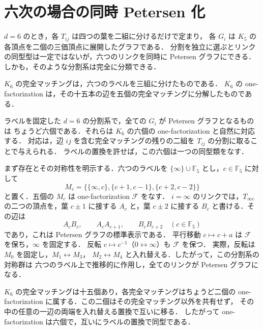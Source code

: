 \section{六次の場合の同時 Petersen 化}\label{topo:petersen-section}

$d=6$ のとき，各 $T_{ij}$ は四つの葉を二組に分けるだけで定まり，
各 $G_i$ は $K_5$ の各頂点を二個の三価頂点に展開したグラフである．
分割を独立に選ぶとリンクの同型型は一定ではないが，六つのリンクを同時に
Petersen グラフにできる．しかも，そのような分割系は完全に分類できる．

\begin{definition}
$K_6$ の完全マッチングは，六つのラベルを三組に分けたものである．
$K_6$ の one-factorization は，その十五本の辺を五個の完全マッチングに分解したものである．
\end{definition}

\begin{theorem}\label{topo:petersen}
ラベルを固定した $d=6$ の分割系で，全ての $G_i$ が Petersen グラフとなるものは
ちょうど六個である．それらは $K_6$ の六個の one-factorization と自然に対応する．
対応は，辺 $ij$ を含む完全マッチングの残りの二組を $T_{ij}$ の分割に取ることで与えられる．
ラベルの置換を許せば，この六個は一つの同型類をなす．
\end{theorem}

まず存在とその対称性を明示する．六つのラベルを
$\{\infty\}\cup\mathbb F_5$ とし，$c\in\mathbb F_5$ に対して
\[
 M_c=\bigl\{\{\infty,c\},\{c+1,c-1\},\{c+2,c-2\}\bigr\}
\]
と置く．五個の $M_c$ は one-factorization $\mathcal F$ をなす．
$i=\infty$ のリンクでは，$T_{\infty c}$ の二つの頂点を，葉 $c\pm1$ に接する
$A_c$ と，葉 $c\pm2$ に接する $B_c$ と書ける．その辺は
\[
 A_cB_c,\qquad A_cA_{c+1},\qquad B_cB_{c+2}\quad(c\in\mathbb F_5)
\]
であり，これは Petersen グラフの標準表示である．
平行移動 $c\mapsto c+a$ は $\mathcal F$ を保ち，$\infty$ を固定する．
反転 $c\mapsto c^{-1}$（$0\leftrightarrow\infty$）も $\mathcal F$ を保つ．
実際，反転は $M_0$ を固定し，$M_1\leftrightarrow M_3$，
$M_2\leftrightarrow M_4$ と入れ替える．したがって，この分割系の対称群は
六つのラベル上で推移的に作用し，全てのリンクが Petersen グラフになる．

\begin{lemma}\label{topo:factorizations}
$K_6$ の完全マッチングは十五個あり，各完全マッチングはちょうど二個の
one-factorization に属する．この二個はその完全マッチング以外を共有せず，
その中の任意の一辺の両端を入れ替える置換で互いに移る．
したがって one-factorization は六個で，互いにラベルの置換で同型である．
\end{lemma}

